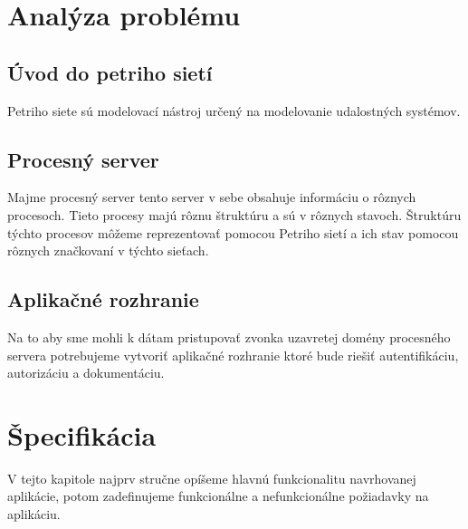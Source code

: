  

  

\section{Analýza problému} 

  

\subsection{Úvod do petriho sietí} %

 Petriho siete sú modelovací nástroj určený na modelovanie udalostných systémov. 


  

  

\subsection{Procesný server} 

 Majme procesný server tento server v sebe obsahuje informáciu o rôznych procesoch. Tieto procesy majú rôznu štruktúru a sú v rôznych stavoch. Štruktúru týchto procesov môžeme reprezentovať pomocou Petriho sietí a ich stav pomocou rôznych značkovaní v týchto sieťach.  


  

\subsection{Aplikačné rozhranie} 

 Na to aby sme mohli k dátam pristupovať zvonka uzavretej domény procesného servera potrebujeme vytvoriť aplikačné rozhranie ktoré bude riešiť autentifikáciu, autorizáciu a dokumentáciu.  


  

  

  

  

\section{Špecifikácia} 
V tejto kapitole najprv stručne opíšeme hlavnú funkcionalitu navrhovanej aplikácie, potom zadefinujeme funkcionálne a nefunkcionálne požiadavky na aplikáciu. 

